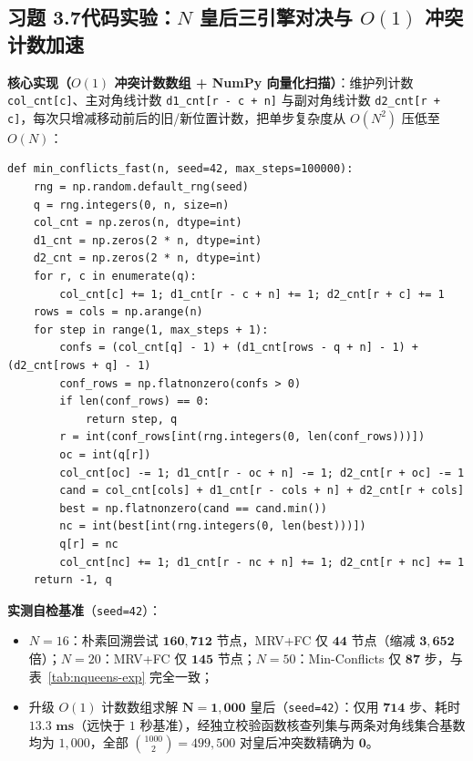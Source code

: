 \subsection*{习题 3.7\quad 代码实验：$N$ 皇后三引擎对决与 $O(1)$ 冲突计数加速}
\textbf{核心实现（$O(1)$ 冲突计数数组 + NumPy 向量化扫描）}：维护列计数 \texttt{col\_cnt[c]}、主对角线计数 \texttt{d1\_cnt[r - c + n]} 与副对角线计数 \texttt{d2\_cnt[r + c]}，每次只增减移动前后的旧/新位置计数，把单步复杂度从 $O(N^2)$ 压低至 $O(N)$：
\begin{lstlisting}
def min_conflicts_fast(n, seed=42, max_steps=100000):
    rng = np.random.default_rng(seed)
    q = rng.integers(0, n, size=n)
    col_cnt = np.zeros(n, dtype=int)
    d1_cnt = np.zeros(2 * n, dtype=int)
    d2_cnt = np.zeros(2 * n, dtype=int)
    for r, c in enumerate(q):
        col_cnt[c] += 1; d1_cnt[r - c + n] += 1; d2_cnt[r + c] += 1
    rows = cols = np.arange(n)
    for step in range(1, max_steps + 1):
        confs = (col_cnt[q] - 1) + (d1_cnt[rows - q + n] - 1) + (d2_cnt[rows + q] - 1)
        conf_rows = np.flatnonzero(confs > 0)
        if len(conf_rows) == 0:
            return step, q
        r = int(conf_rows[int(rng.integers(0, len(conf_rows)))])
        oc = int(q[r])
        col_cnt[oc] -= 1; d1_cnt[r - oc + n] -= 1; d2_cnt[r + oc] -= 1
        cand = col_cnt[cols] + d1_cnt[r - cols + n] + d2_cnt[r + cols]
        best = np.flatnonzero(cand == cand.min())
        nc = int(best[int(rng.integers(0, len(best)))])
        q[r] = nc
        col_cnt[nc] += 1; d1_cnt[r - nc + n] += 1; d2_cnt[r + nc] += 1
    return -1, q
\end{lstlisting}
\textbf{实测自检基准}（\texttt{seed=42}）：
\begin{itemize}
  \item $N=16$：朴素回溯尝试 $\mathbf{160{,}712}$ 节点，MRV+FC 仅 $\mathbf{44}$ 节点（缩减 $\mathbf{3{,}652}$ 倍）；$N=20$：MRV+FC 仅 $\mathbf{145}$ 节点；$N=50$：Min-Conflicts 仅 $\mathbf{87}$ 步，与表~\ref{tab:nqueens-exp} 完全一致；
  \item 升级 $O(1)$ 计数数组求解 $\mathbf{N = 1{,}000}$ 皇后（\texttt{seed=42}）：仅用 $\mathbf{714}$ 步、耗时 $\mathbf{13.3\text{ ms}}$（远快于 $1$ 秒基准），经独立校验函数核查列集与两条对角线集合基数均为 $1{,}000$，全部 $\binom{1000}{2} = 499{,}500$ 对皇后冲突数精确为 $\mathbf{0}$。
\end{itemize}

